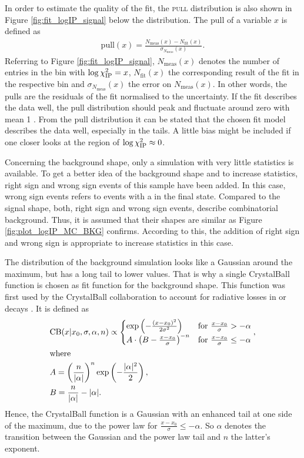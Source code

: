 In order to estimate the quality of the fit, the \textsc{pull} distribution is also shown in Figure \ref{fig:fit_logIP_signal} below the \logIP distribution.
The pull of a variable $x$ is defined as
\begin{align}
    \text{pull}(x) = \frac{N_\text{meas}(x)-N_\text{fit}(x)}{\sigma_{N_\text{meas}}(x)}.  \label{eq:pull}
\end{align}
Referring to Figure \ref{fig:fit_logIP_signal}, $N_\text{meas}(x)$ denotes the number of entries in the bin with $\log \chi^2_{\text{IP}} = x$, $N_\text{fit}(x)$ the corresponding result of the fit in the respective bin and $\sigma_{N_\text{meas}}(x)$ the error on $N_\text{meas}(x)$.
In other words, the pulls are the residuals of the fit normalised to the uncertainty.
If the fit describes the data well, the pull distribution should peak and fluctuate around zero with mean 1 \cite{Pulls}.
From the pull distribution it can be stated that the chosen fit model describes the data well, especially in the tails.
A little bias might be included if one closer looks at the region of $\log \chi^2_{\text{IP}} \approx 0$.

Concerning the \logIP background shape, only a simulation with very little statistics is available.
To get a better idea of the background \logIP shape and to increase statistics, right sign and wrong sign events of this sample have been added.
In this case, wrong sign events refers to events with a \Lc\mup in the final state.
Compared to the signal \logIP shape, both, right sign and wrong sign events, describe combinatorial background.
Thus, it is assumed that their \logIP shapes are similar as Figure \ref{fig:plot_logIP_MC_BKG} confirms. 
According to this, the addition of right sign and wrong sign is appropriate to increase statistics in this case.

The \logIP distribution of the background simulation looks like a Gaussian around the maximum, but has a long tail to lower \logIP values.
That is why a single CrystalBall function is chosen as fit function for the \logIP background shape. 
This function was first used by the CrystalBall collaboration to account for radiative losses in \jpsi or \psitwos decays \cite{CrystalBall}. 
It is defined as 
\begin{align}
    &\text{CB}(x|x_0, \sigma, \alpha, n) \propto
    \begin{cases}
        \exp \left(-\frac{(x-x_0)^2}{2\sigma^2}\right)     & \text{for } \frac{x-x_0}{\sigma} > -\alpha \\
        A \cdot \left(B - \frac{x-x_0}{\sigma}\right)^{-n} & \text{for } \frac{x-x_0}{\sigma} \leq -\alpha
    \end{cases}, \\
    &\text{where} \nonumber\\
    &A = \left(\frac{n}{|\alpha|}\right)^n \exp\left(-\frac{|\alpha|^2}{2}\right), \\
    &B = \frac{n}{|\alpha|} - |\alpha|.
\end{align}
Hence, the CrystalBall function is a Gaussian with an enhanced tail at one side of the maximum, due to the power law for $\frac{x-x_0}{\sigma} \leq -\alpha$.
So $\alpha$ denotes the transition between the Gaussian and the power law tail and $n$ the latter's exponent.

